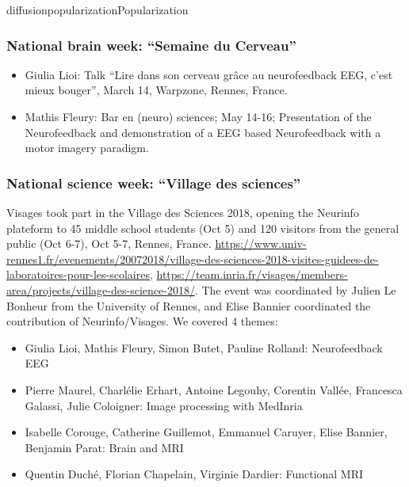 \documentclass{ra2018}
\begin{document}
\begin{module}{diffusion}{popularization}{Popularization}
\subsubsection{National brain week: ``Semaine du Cerveau''}
\begin{itemize}
    \item Giulia Lioi: Talk ``Lire dans son cerveau grâce au neurofeedback EEG, c’est mieux bouger'', March 14, Warpzone, Rennes, France. 
    \item Mathis Fleury: Bar en (neuro) sciences; May 14-16; Presentation of the Neurofeedback and demonstration of a EEG based Neurofeedback with a motor imagery paradigm. 
\end{itemize}

\subsubsection{National science week: ``Village des sciences''}
Visages took part in the Village des Sciences 2018, opening the Neurinfo plateform to 45 middle school students (Oct 5) and 120 visitors from the general public (Oct 6-7), Oct 5-7, Rennes, France. \url{https://www.univ-rennes1.fr/evenements/20072018/village-des-sciences-2018-visites-guidees-de-laboratoires-pour-les-scolaires}, \url{https://team.inria.fr/visages/members-area/projects/village-des-science-2018/}. The event was coordinated by Julien Le Bonheur from the University of Rennes, and Elise Bannier coordinated the contribution of Neurinfo/Visages. We covered 4 themes: 
\begin{itemize}
        \item Giulia Lioi, Mathis Fleury, Simon Butet, Pauline Rolland: Neurofeedback EEG
        \item Pierre Maurel, Charlélie Erhart, Antoine Legouhy, Corentin Vallée, Francesca Galassi, Julie Coloigner: Image processing with MedInria
        \item Isabelle Corouge, Catherine Guillemot, Emmanuel Caruyer, Elise Bannier, Benjamin Parat: Brain and MRI
        \item Quentin Duché, Florian Chapelain, Virginie Dardier: Functional MRI
\end{itemize}


\end{module}
\end{document}
